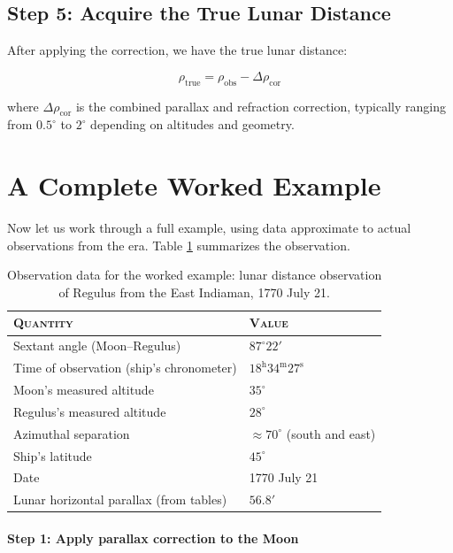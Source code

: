 \subsection{Step 5: Acquire the True Lunar Distance}

After applying the correction, we have the true lunar distance:

\begin{equation}
\rho_{\text{true}} = \rho_{\text{obs}} - \Delta\rho_{\text{cor}}
\end{equation}

where $\Delta\rho_{\text{cor}}$ is the combined parallax and refraction correction, typically ranging from $0.5^{\circ}$ to $2^{\circ}$ depending on altitudes and geometry.

\section{A Complete Worked Example}

Now let us work through a full example, using data approximate to actual observations from the era. Table \ref{tab:observation-data} summarizes the observation.

\begin{table}[htbp]
\centering
\caption{Observation data for the worked example: lunar distance observation of Regulus from the East Indiaman, 1770 July 21.}
\label{tab:observation-data}
\begin{tabular}{ll}
\toprule
\textsc{Quantity} & \textsc{Value} \\
\midrule
Sextant angle (Moon--Regulus) & $87^{\circ} 22'$ \\
Time of observation (ship's chronometer) & $18^{\mathrm{h}} 34^{\mathrm{m}} 27^{\mathrm{s}}$ \\
Moon's measured altitude & $35^{\circ}$ \\
Regulus's measured altitude & $28^{\circ}$ \\
Azimuthal separation & $\approx 70^{\circ}$ (south and east) \\
Ship's latitude & $45^{\circ}$ \\
Date & 1770 July 21 \\
Lunar horizontal parallax (from tables) & $56.8'$ \\
\bottomrule
\end{tabular}
\end{table}

\paragraph{Step 1: Apply parallax correction to the Moon}

